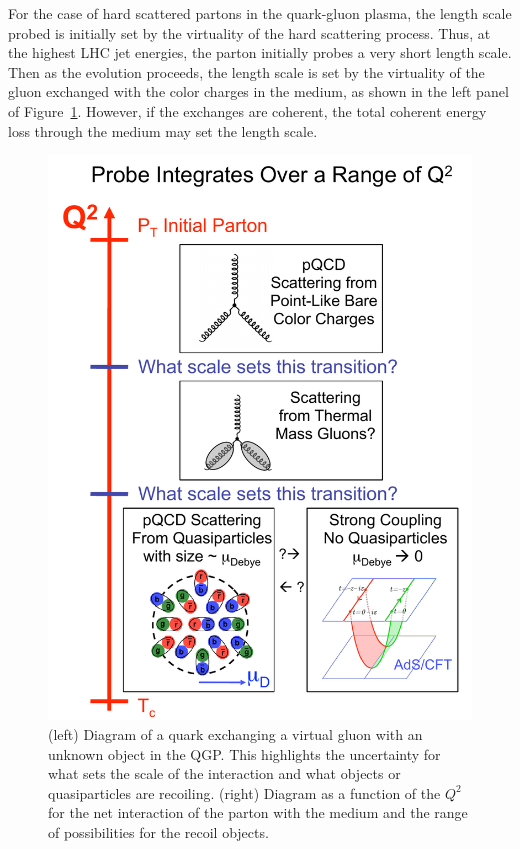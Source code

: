 For the case of hard scattered partons in the quark-gluon plasma, the length scale probed
is initially set by the virtuality of the hard scattering process.  Thus, at the
highest LHC jet energies, the parton initially probes a very short length scale.  
Then as the evolution proceeds, the length scale is set by
the virtuality of the gluon exchanged with the
color charges in the medium, as shown in the left panel of
Figure~\ref{fig:probescale}.  However, if the exchanges are coherent, 
the total coherent energy loss through
the medium may set the length scale.

\begin{figure}[!hbt]
 \begin{center}
    \hfill
    \includegraphics[trim = 2 2 2 50, clip,width=0.4\linewidth]{figs/figure_physicscase_probescale2}
    \caption[Interaction scale for the interaction of partons with the
    \qgp and possibilities for the recoil objects]{(left) Diagram of a
      quark exchanging a virtual gluon with an unknown object in the
      QGP.  This highlights the uncertainty for what sets the scale of
      the interaction and what objects or quasiparticles are
      recoiling.  (right) Diagram as a function of the $Q^{2}$ for the
      net interaction of the parton with the medium and the range of
      possibilities for the recoil objects.\label{fig:probescale}}
 \end{center}
\end{figure}


